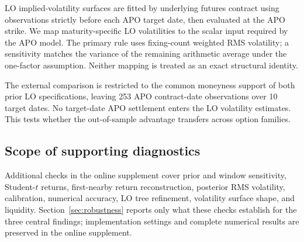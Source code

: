 LO implied-volatility surfaces are fitted by underlying futures contract using observations strictly before each APO target date, then evaluated at the APO strike. We map maturity-specific LO volatilities to the scalar input required by the APO model. The primary rule uses fixing-count weighted RMS volatility; a sensitivity matches the variance of the remaining arithmetic average under the one-factor assumption. Neither mapping is treated as an exact structural identity.

The external comparison is restricted to the common moneyness support of both prior LO specifications, leaving 253 APO contract-date observations over 10 target dates. No target-date APO settlement enters the LO volatility estimates. This tests whether the out-of-sample advantage transfers across option families.

\subsection{Scope of supporting diagnostics}

Additional checks in the online supplement cover prior and window sensitivity, Student-\(t\) returns, first-nearby return reconstruction, posterior RMS volatility, calibration, numerical accuracy, LO tree refinement, volatility surface shape, and liquidity. Section~\ref{sec:robustness} reports only what these checks establish for the three central findings; implementation settings and complete numerical results are preserved in the online supplement.
